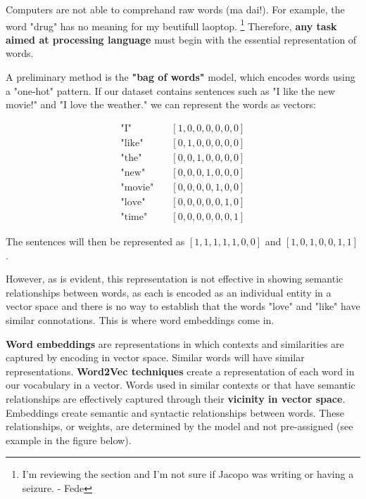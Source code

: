 Computers are not able to comprehand raw words (ma dai!). For example, the word "drug" has no meaning for my beutifull laoptop. \footnote{I'm reviewing the section and I'm not sure if Jacopo was writing or having a seizure.  - Fede} Therefore, \textbf{any task aimed at processing language} must begin with the essential representation of words.

A preliminary method is the \textbf{"bag of words"} model, which encodes words using a "one-hot" pattern. If our dataset contains sentences such as "I like the new movie!" and "I love the weather." we can represent the words as vectors:

\vspace{-1cm}
\begin{minipage}[t]{0.45\textwidth}
\begin{align*}
\text{"I"} \quad &[1,0,0,0,0,0,0] \\
\text{"like"} \quad &[0,1,0,0,0,0,0] \\
\text{"the"} \quad &[0,0,1,0,0,0,0] \\
\text{"new"} \quad &[0,0,0,1,0,0,0] \\
\text{"movie"}\quad  &[0,0,0,0,1,0,0] \\
\text{"love"} \quad &[0,0,0,0,0,1,0] \\
\text{"time"} \quad &[0,0,0,0,0,0,1]
\end{align*}
\end{minipage}
\begin{minipage}[t]{0.45\textwidth}
\vspace{2cm}
\begin{center}
The sentences will then be represented as $[1,1,1,1,1,0,0]$ and $[1,0,1,0,0,1,1]$.
\end{center}
\end{minipage}
\begin{minipage}[t]{0.1\textwidth}
\end{minipage}

However, as is evident, this representation is not effective in showing semantic relationships between words, as each is encoded as an individual entity in a vector space and there is no way to establish that the words "love" and "like" have similar connotations. This is where word embeddings come in.

\textbf{Word embeddings} are representations in which contexts and similarities are captured by encoding in vector space. Similar words will have similar representations. \textbf{Word2Vec techniques} create a representation of each word in our vocabulary in a vector. Words used in similar contexts or that have semantic relationships are effectively captured through their \textbf{vicinity in vector space}. Embeddings create semantic and syntactic relationships between words. These relationships, or weights, are determined by the model and not pre-assigned (see example in the figure below).

